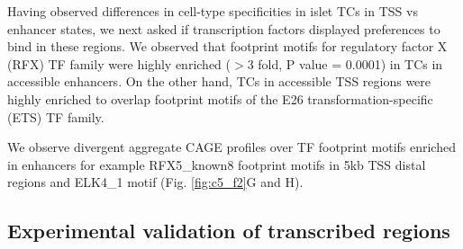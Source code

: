 Having observed differences in cell-type specificities in islet TCs in TSS vs enhancer states, we next asked if transcription factors displayed preferences to bind in these regions. We observed that footprint motifs for regulatory factor X (RFX) TF family were highly enriched ($>$3 fold, P value = 0.0001) in TCs in accessible enhancers. On the other hand, TCs in accessible TSS regions were highly enriched to overlap footprint motifs of the E26 transformation-specific (ETS) TF family. 


We observe divergent aggregate CAGE profiles over TF footprint motifs enriched in enhancers for example RFX5\_known8 footprint motifs in 5kb TSS distal regions and ELK4\_1 motif (Fig. \ref{fig:c5_f2}G and H).


\subsection{Experimental validation of transcribed regions}
